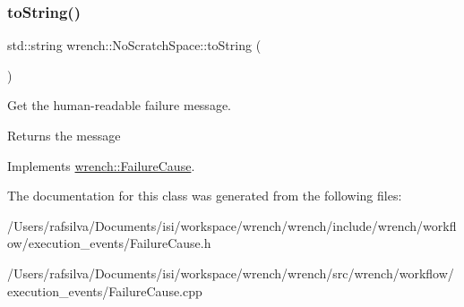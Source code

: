 \subsubsection{\texorpdfstring{to\+String()}{toString()}}
{\footnotesize\ttfamily std\+::string wrench\+::\+No\+Scratch\+Space\+::to\+String (\begin{DoxyParamCaption}{ }\end{DoxyParamCaption})\hspace{0.3cm}{\ttfamily [virtual]}}



Get the human-\/readable failure message. 

\begin{DoxyReturn}{Returns}
the message 
\end{DoxyReturn}


Implements \hyperlink{classwrench_1_1_failure_cause_afbad248ebe902409f2cd4f1d6f2b867d}{wrench\+::\+Failure\+Cause}.



The documentation for this class was generated from the following files\+:\begin{DoxyCompactItemize}
\item 
/\+Users/rafsilva/\+Documents/isi/workspace/wrench/wrench/include/wrench/workflow/execution\+\_\+events/Failure\+Cause.\+h\item 
/\+Users/rafsilva/\+Documents/isi/workspace/wrench/wrench/src/wrench/workflow/execution\+\_\+events/Failure\+Cause.\+cpp\end{DoxyCompactItemize}
